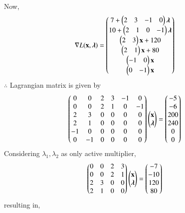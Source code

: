 Now,
\begin{align}
    \nabla L(\mathbf{x},\boldsymbol{\lambda}) &= \begin{pmatrix}7+ \begin{pmatrix}2 & 3 & -1 & 0 \end{pmatrix}\boldsymbol{\lambda}\\ 10+\begin{pmatrix}2 & 1 & 0 & -1\end{pmatrix}\boldsymbol{\lambda} \\ \begin{pmatrix}2 & 3\end{pmatrix}\mathbf{x}+120 \\ \begin{pmatrix}2 & 1\end{pmatrix}\mathbf{x}+80 \\ \begin{pmatrix}-1 & 0\end{pmatrix}\mathbf{x} \\ \begin{pmatrix}0 & -1\end{pmatrix}\mathbf{x}\end{pmatrix}
\end{align}
$\therefore$ Lagrangian matrix is given by
\begin{align}
    \begin{pmatrix}0 & 0 & 2 & 3 & -1 & 0 \\ 0 & 0 & 2 & 1 & 0 & -1 \\ 2 & 3 & 0 & 0 & 0 & 0  \\ 2 & 1 & 0 & 0 & 0 & 0  \\ -1 & 0 & 0 & 0 & 0 & 0  \\ 0 & -1 & 0 & 0 & 0 & 0 \end{pmatrix}\begin{pmatrix}\mathbf{x} \\ \boldsymbol{\lambda} \end{pmatrix} &= \begin{pmatrix}-5 \\ -6 \\ 200 \\ 240 \\ 0 \\0 \end{pmatrix}
\end{align}
Considering $\lambda_1,\lambda_2$ as only active multiplier,
\begin{align}
    \begin{pmatrix}0 & 0 & 2 & 3 \\ 0 & 0 & 2 & 1 \\ 2 & 3 & 0 & 0 \\ 2 & 1 & 0 & 0\end{pmatrix}\begin{pmatrix}\mathbf{x}\\ \boldsymbol{\lambda}\end{pmatrix} &=\begin{pmatrix}-7 \\ -10 \\ 120 \\ 80\end{pmatrix}
\end{align}
resulting in,
